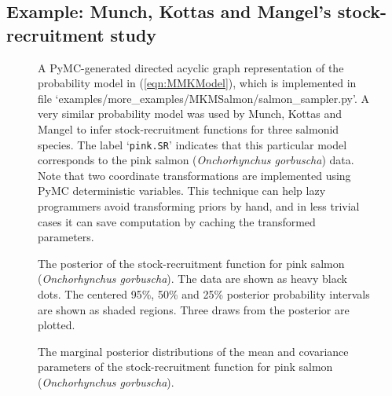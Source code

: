 \documentclass[]{manual}
\begin{document}
\subsection{Example: Munch, Kottas and Mangel's stock-recruitment study}\label{sub:MMKMCMC}

\begin{figure}
    \centering
    \caption{A PyMC-generated directed acyclic graph representation of the probability model in (\ref{eqn:MMKModel}), which is implemented in file \textsf{`examples/more_examples/MKMSalmon/salmon_sampler.py'}. A very similar probability model was used by Munch, Kottas and Mangel to infer stock-recruitment functions for three salmonid species. The label `\texttt{pink.SR}' indicates that this particular model corresponds to the pink salmon (\emph{Onchorhynchus gorbuscha}) data. Note that two coordinate transformations are implemented using PyMC deterministic variables. This technique can help lazy programmers avoid transforming priors by hand, and in less trivial cases it can save computation by caching the transformed parameters.}
    \label{fig:MMKsalmonmodel}
\end{figure}

\begin{figure}
    \centering
    \caption{The posterior of the stock-recruitment function for pink salmon (\emph{Onchorhynchus gorbuscha}). The data are shown as heavy black dots. The centered 95\%, 50\% and 25\% posterior probability intervals are shown as shaded regions. Three draws from the posterior are plotted.}
    \label{fig:pinkfpost}
\end{figure}

\begin{figure}
    \centering
    \caption{The marginal posterior distributions of the mean and covariance parameters of the stock-recruitment function for pink salmon (\emph{Onchorhynchus gorbuscha}).}
    \label{fig:pinkparams}
\end{figure}
\end{document}
